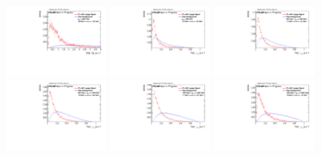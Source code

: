 \begin{figure}[H]
\includegraphics[width=0.3\textwidth]{sascha_input/Appendix/Distributions/w/distributions/beta17/h_assisted_tj_D2_17_bin6.pdf}
\bigskip 
\includegraphics[width=0.3\textwidth]{sascha_input/Appendix/Distributions/w/distributions/beta17/h_assisted_tj_nSub21_17_bin1.pdf} \hspace{1mm}
\includegraphics[width=0.3\textwidth]{sascha_input/Appendix/Distributions/w/distributions/beta17/h_assisted_tj_nSub21_17_bin2.pdf} \hspace{1mm}
\includegraphics[width=0.3\textwidth]{sascha_input/Appendix/Distributions/w/distributions/beta17/h_assisted_tj_nSub21_17_bin3.pdf} 
\bigskip
\includegraphics[width=0.3\textwidth]{sascha_input/Appendix/Distributions/w/distributions/beta17/h_assisted_tj_nSub21_17_bin4.pdf} \hspace{6mm}
\includegraphics[width=0.3\textwidth]{sascha_input/Appendix/Distributions/w/distributions/beta17/h_assisted_tj_nSub21_17_bin5.pdf} \hspace{6mm}

\end{figure}
